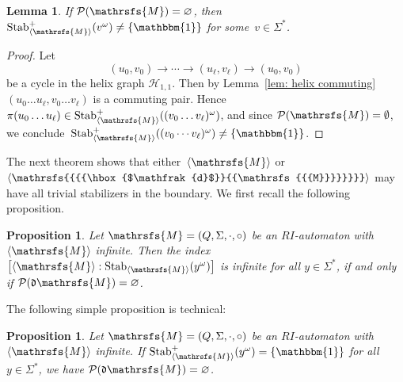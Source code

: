 \documentclass{amsart}
\newtheorem{proposition}[theorem]{Proposition}
\newtheorem{lemma}[theorem]{Lemma}
\begin{document}
\begin{lemma}\label{cor: empty positive relations implies stab}
If $\mathcal{P}({{{\mathrsfs{{M}}}}})=\varnothing$, then $\operatorname{Stab}^{+}_{{{\langle}{{\mathrsfs{{{M}}}}}{\rangle}}}(v^{\omega})\neq \{\operatorname{\mathbbm{1}}\}$ for some~$v\in {{{\Sigma}}}^{*}$.
\end{lemma}
\begin{proof}
Let $$
(u_{0},v_{0}){\longrightarrow}\cdots {\longrightarrow}(u_{\ell},v_{\ell}){\longrightarrow}(u_{0},v_{0})
$$ be a cycle in the helix graph $\mathcal{H}_{1,1}$. Then by Lemma~\ref{lem: helix commuting} $(u_0\hdots u_\ell, v_0 \hdots v_\ell)$ is a commuting pair. Hence $\pi(u_0\hdots u_\ell) \in \operatorname{Stab}^+_{{{\langle}{{\mathrsfs{{{M}}}}}{\rangle}}}((v_0\hdots v_\ell)^\omega)$, and since $\mathcal{P}({{{\mathrsfs{{M}}}}}) = \emptyset $, we conclude~$\operatorname{Stab}^+_{{{\langle}{{\mathrsfs{{{M}}}}}{\rangle}}}((v_0\cdots v_\ell)^\omega) \neq \{\operatorname{\mathbbm{1}} \}$.
\end{proof}

The next theorem shows that either~${{{\langle}{{\mathrsfs{{{M}}}}}{\rangle}}}$ or~${{{{\langle}{{\mathrsfs{{{{\hbox{$\mathfrak{d}$}}{{\mathrsfs{{{M}}}}}}}}}}{\rangle}}}}$ may have all trivial stabilizers in the boundary. We first recall the following proposition.

\begin{proposition}\cite[Corollary 5]{DaRo15}\label{prop: no positive dual}
Let ${{{\mathrsfs{{M}}}}}=({{{Q}}},{{{\Sigma}}},{{{\cdot}}}, {{{\circ}}})$ be an $RI$-automaton with~${{{\langle}{{\mathrsfs{{{M}}}}}{\rangle}}}$ infinite. Then the index
$\left[{{{\langle}{{\mathrsfs{{{M}}}}}{\rangle}}}:\operatorname{Stab}_{{{\langle}{{\mathrsfs{{{M}}}}}{\rangle}}}(y^{\omega})\right]$ is infinite for all $y\in {{{\Sigma}}}^{*}$,
if and only if
$\mathcal{P}({\hbox{$\mathfrak{d}$}}{{{\mathrsfs{{M}}}}})=\varnothing$.
\end{proposition}

The following simple proposition is technical:

\begin{proposition}\label{prop: alternative with dual}
Let ${{{\mathrsfs{{M}}}}}=({{{Q}}},{{{\Sigma}}},{{{\cdot}}}, {{{\circ}}})$ be an $RI$-automaton with ${{{\langle}{{\mathrsfs{{{M}}}}}{\rangle}}}$ infinite. If \/ $\operatorname{Stab}^{+}_{{{\langle}{{\mathrsfs{{{M}}}}}{\rangle}}}(y^{\omega})= \{\operatorname{\mathbbm{1}}\}$ for all $y\in {{{\Sigma}}}^{*}$, we have $\mathcal{P}({\hbox{$\mathfrak{d}$}}{{{\mathrsfs{{M}}}}})=\varnothing$.
\end{proposition}
\end{document}
